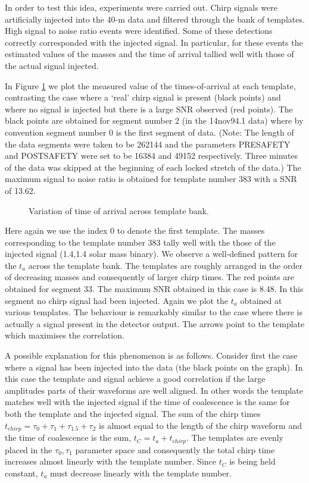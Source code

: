In order to test this idea, experiments were carried out. 
Chirp signals were artificially injected into the 40-m data and
filtered through the bank of templates. High signal to noise ratio
events were identified. Some of these detections correctly
corresponded with the injected signal. In particular, for these events
the estimated values of the masses and the time of arrival  tallied
well with those of the actual signal injected. 



In Figure \ref{f:timesofarrival} we plot the measured value of the
times-of-arrival at each template, contrasting the case where a `real'
chirp signal is present (black points) and where no signal is injected
but there is a large SNR observed (red points).  The black points are
obtained for segment number 2 (in the 14nov94.1 data) where by convention
segment number 0 is the first segment of data. (Note: The length of the
data segments were taken to be 262144 and the parameters PRESAFETY and
POSTSAFETY were set to be 16384 and 49152 respectively. Three minutes of
the data was skipped at the beginning of each locked stretch of the data.)
The maximum signal to noise ratio is obtained for template number 383
with a SNR of 13.62.
\begin{figure}[hb]
\begin{center}
\caption{ \label{f:timesofarrival} Variation of time of arrival across template bank.}
\end{center}
\end{figure}
Here again we use the index 0 to denote the first template.
The masses corresponding to the
template number 383 tally well with the those of the 
injected signal (1.4,1.4 solar
mass binary). We observe a well-defined pattern for the $t_a$ across
the template bank.  The templates are roughly arranged in the order of
decreasing masses and consequently of larger chirp times. 
The red points are obtained for segment 33. The maximum SNR obtained
in this case is 8.48. In this segment no chirp signal had been
injected. Again we plot the $t_a$ obtained at various templates.  
The behaviour is remarkably similar to the case where there is
actually a signal present in the detector output. The arrows point to
the template which maximises the correlation. 

A possible explanation for this phenomenon is as follows. Consider
first the case where a signal has been injected into the data (the
black points on the graph).
In this case the template and signal
achieve  a good  correlation if the large amplitudes parts of their
waveforms  are well aligned. In other words the template matches well
with the injected signal if the time of coalescence is the same for
both the template and the injected signal.  
The sum of the chirp times $t_{chirp} = \tau_0+\tau_1+\tau_{1.5}+\tau_2$
is almost equal to the length of the chirp waveform and the
time of coalescence is the sum, $t_C = t_a + t_{chirp}$.
The templates are evenly placed in the $\tau_0,\tau_1$
parameter space and consequently the total chirp time increases
almost linearly with the template number. Since  $t_C$ is being
held constant, $t_a$ must decrease linearly with the
template number. 

